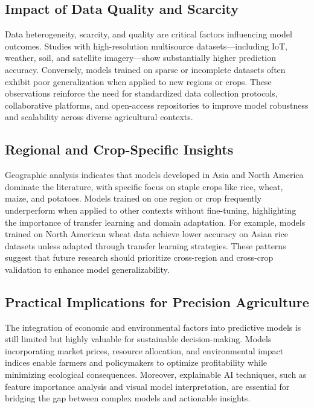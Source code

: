 \documentclass[conference]{IEEEtran}
\begin{document}
\subsection{Impact of Data Quality and Scarcity}

Data heterogeneity, scarcity, and quality are critical factors influencing model outcomes. Studies with high-resolution multisource datasets—including IoT, weather, soil, and satellite imagery—show substantially higher prediction accuracy. Conversely, models trained on sparse or incomplete datasets often exhibit poor generalization when applied to new regions or crops. These observations reinforce the need for standardized data collection protocols, collaborative platforms, and open-access repositories to improve model robustness and scalability across diverse agricultural contexts.

\subsection{Regional and Crop-Specific Insights}

Geographic analysis indicates that models developed in Asia and North America dominate the literature, with specific focus on staple crops like rice, wheat, maize, and potatoes. Models trained on one region or crop frequently underperform when applied to other contexts without fine-tuning, highlighting the importance of transfer learning and domain adaptation. For example, models trained on North American wheat data achieve lower accuracy on Asian rice datasets unless adapted through transfer learning strategies. These patterns suggest that future research should prioritize cross-region and cross-crop validation to enhance model generalizability.

\subsection{Practical Implications for Precision Agriculture}

The integration of economic and environmental factors into predictive models is still limited but highly valuable for sustainable decision-making. Models incorporating market prices, resource allocation, and environmental impact indices enable farmers and policymakers to optimize profitability while minimizing ecological consequences. Moreover, explainable AI techniques, such as feature importance analysis and visual model interpretation, are essential for bridging the gap between complex models and actionable insights.
\end{document}
